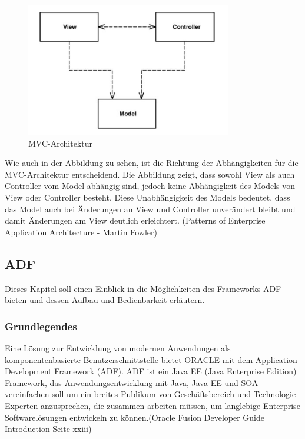 \begin{figure}
\centering
\includegraphics[width=0.80\textwidth]{img/MVC-Allgemein(Fowler).png}
\caption {MVC-Architektur}
\end{figure}
Wie auch in der Abbildung zu sehen, ist die Richtung der Abhängigkeiten für die MVC-Architektur entscheidend. Die Abbildung zeigt, dass sowohl View als auch Controller vom Model abhängig sind, jedoch keine Abhängigkeit des Models von View oder Controller besteht. Diese Unabhängigkeit des Models bedeutet, dass das Model auch bei Änderungen an View und Controller unverändert bleibt und damit Änderungen am View deutlich erleichtert.
(Patterns of Enterprise Application Architecture - Martin Fowler)
\subsection{ADF}
Dieses Kapitel soll einen Einblick in die Möglichkeiten des Frameworks ADF bieten und dessen Aufbau und Bedienbarkeit erläutern.

\subsubsection{Grundlegendes}

Eine Lösung zur Entwicklung von modernen Anwendungen als komponentenbasierte Benutzerschnittstelle bietet ORACLE mit dem Application Development Framework (ADF). ADF ist ein Java EE (Java Enterprise Edition) Framework, das Anwendungsentwicklung mit Java, Java EE und SOA vereinfachen soll um ein breites Publikum von Geschäftsbereich und Technologie Experten anzusprechen, die zusammen arbeiten müssen, um langlebige Enterprise Softwarelösungen entwickeln zu können.(Oracle Fusion Developer Guide Introduction Seite xxiii)
